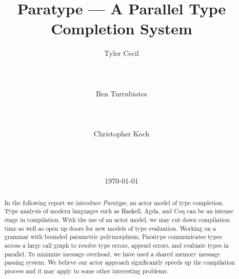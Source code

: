 \documentclass{acm_proc_article-sp}
\begin{document}
\title{Paratype --- A Parallel Type Completion System}


\author{
\alignauthor
Tyler Cecil\\
       \\
       \\
       \\
\alignauthor
Ben Turrubiates\\
       \\
       \\
       \\
\alignauthor
Christopher Koch\\
       \\
       \\
       \\
}
\date{\today}

\maketitle
\begin{abstract}
  In the following report we introduce \emph{Paratype}, an actor model of
  type completion. Type analysis of modern languages such as
  Haskell, Agda, and Coq can be an intense stage in compilation. %
  With the use
  of an actor model, we may cut down compilation time as well as open up
  doors for new models of type evaluation. Working on a grammar with bounded
  parametric polymorphism, Paratype communicates types across a large call
  graph to resolve type errors, append errors, and evaluate types in parallel.
  To minimize message overhead, we have used a shared memory message
  passing system. We believe our actor approach significantly
  speeds up the compilation process and it may apply to some other interesting
  problems.
\end{abstract}


\end{document}
